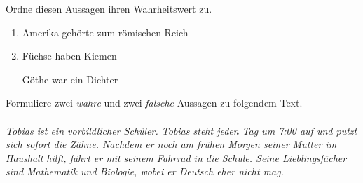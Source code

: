 \documentclass{uebungsblatt}
\begin{document}
\begin{exercise}

    Ordne diesen Aussagen ihren Wahrheitswert zu.

    \begin{multicols}{2}
        \begin{enumerate}[label=\alph*)]
            \citem Die Zahl 3 ist ungerade
            \item Amerika gehörte zum römischen Reich
            \item Füchse haben Kiemen 
            \citem Göthe war ein Dichter
        \end{enumerate}
    \end{multicols}

\end{exercise}    

\begin{exercise}
    Formuliere zwei \emph{wahre} und zwei \emph{falsche} Aussagen zu folgendem Text.
    \\ \\
    \emph{Tobias ist ein vorbildlicher Schüler. Tobias steht jeden Tag um 7:00 auf und putzt sich sofort die Zähne. Nachdem er noch am frühen Morgen seiner Mutter im Haushalt hilft, fährt er mit seinem Fahrrad in die Schule. Seine Lieblingsfächer sind Mathematik und Biologie, wobei er Deutsch eher nicht mag.}

    \begin{answerbox}[1in]
    \end{answerbox}
\end{exercise}

\end{document}
